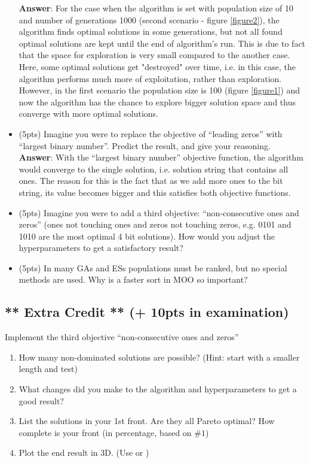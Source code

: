 \documentclass{article}
\begin{document}
\begin{itemize}
	 \textbf{Answer}: For the case when the algorithm is set with population size of 10 and number of generations 1000 (second scenario - figure \ref{figure2}), the algorithm finds  optimal solutions in some generations, but not all found optimal solutions are kept until the end of algorithm's run. This is due to fact that the space for exploration is very small compared to the another case. Here, some optimal solutions get "destroyed" over time, i.e. in this case, the algorithm performs much more of exploitation, rather than exploration. However, in the first scenario the population size is 100 (figure \ref{figure1}) and now the algorithm has the chance to explore bigger solution space and thus converge with more optimal solutions.
	\item (5pts) Imagine you were to replace the objective of ``leading zeros'' with ``largest binary number''. Predict the result, and give your reasoning.\\ [2mm]
	\textbf{Answer}: With the ``largest binary number'' objective function, the algorithm would  converge to the single solution, i.e. solution string that contains all ones. The reason for this is the fact that as we add more ones to the bit string, its value becomes bigger and this satisfies both objective functions.
	\item (5pts) Imagine you were to add a third objective: ``non-consecutive ones and zeros'' (ones not touching ones and zeros not touching zeros, e.g. 0101 and 1010 are the most optimal 4 bit solutions). How would you adjust the hyperparameters to get a satisfactory result?
	\item (5pts) In many GAs and ESs populations must be ranked, but no special methods are used. Why is a faster sort in MOO so important?
\end{itemize}

\newpage
\subsection{** Extra Credit ** (+ 10pts in examination)}
Implement the third objective ``non-consecutive ones and zeros''
\begin{enumerate}
	\item How many non-dominated solutions are possible? (Hint: start with a smaller length and test)
	\item What changes did you make to the algorithm and hyperparameters to get a good result?
	\item List the solutions in your 1st front. Are they all Pareto optimal? How complete is your front (in percentage, based on $\#1$)
	\item Plot the end result in 3D. (Use  or )
\end{enumerate}
\end{document}
